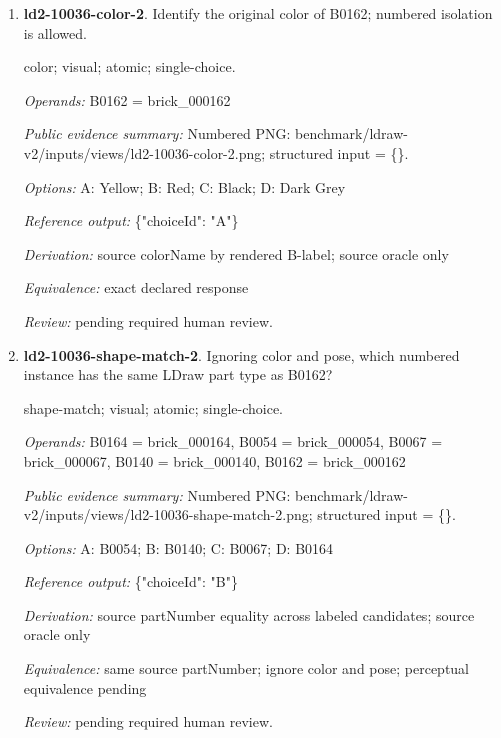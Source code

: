 \begin{enumerate}
\par{\small distance; source-data; atomic; single-choice.\par\textit{Operands:} B0142 = brick\_000142, B0018 = brick\_000018, B0063 = brick\_000063, B0149 = brick\_000149\par\textit{Public evidence summary:} \{"coordinateFrame": "Viewer world, millimeters, Euclidean distance", "centers": \{"B0063": [32, 66.4, -20], "B0149": [45.643616, 13.999961, 60.094864], "B0142": [-54.752249, 18.188798, 57.747503], "B0018": [56, 24.8, -32]\}\}\par\textit{Options:} A: B0142; B: B0149; C: B0018\par\textit{Reference output:} \{"choiceId": "C"\}\par\textit{Derivation:} Euclidean norm from public rounded centers\par\textit{Equivalence:} exact declared response\par\textit{Review:} pending required human review.}
\item \textbf{ld2-10036-color-2}. Identify the original color of B0162; numbered isolation is allowed.
\par{\small color; visual; atomic; single-choice.\par\textit{Operands:} B0162 = brick\_000162\par\textit{Public evidence summary:} Numbered PNG: benchmark/ldraw-v2/inputs/views/ld2-10036-color-2.png; structured input = \{\}.\par\textit{Options:} A: Yellow; B: Red; C: Black; D: Dark Grey\par\textit{Reference output:} \{"choiceId": "A"\}\par\textit{Derivation:} source colorName by rendered B-label; source oracle only\par\textit{Equivalence:} exact declared response\par\textit{Review:} pending required human review.}
\item \textbf{ld2-10036-shape-match-2}. Ignoring color and pose, which numbered instance has the same LDraw part type as B0162?
\par{\small shape-match; visual; atomic; single-choice.\par\textit{Operands:} B0164 = brick\_000164, B0054 = brick\_000054, B0067 = brick\_000067, B0140 = brick\_000140, B0162 = brick\_000162\par\textit{Public evidence summary:} Numbered PNG: benchmark/ldraw-v2/inputs/views/ld2-10036-shape-match-2.png; structured input = \{\}.\par\textit{Options:} A: B0054; B: B0140; C: B0067; D: B0164\par\textit{Reference output:} \{"choiceId": "B"\}\par\textit{Derivation:} source partNumber equality across labeled candidates; source oracle only\par\textit{Equivalence:} same source partNumber; ignore color and pose; perceptual equivalence pending\par\textit{Review:} pending required human review.}

\end{enumerate}
